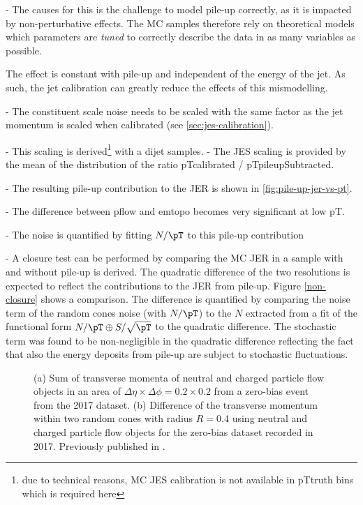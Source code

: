 - The causes for this is the challenge to model pile-up correctly, as it is impacted by non-perturbative effects. The MC samples therefore rely on theoretical models which parameters are \emph{tuned} to correctly describe the data in as many variables as possible.

The effect is constant with pile-up and independent of the energy of the jet. As such, the jet calibration can greatly reduce the effects of this mismodelling.

- The constituent scale noise needs to be scaled with the same factor as the jet momentum is scaled when calibrated (see \cref{sec:jes-calibration}).

- This scaling is derived\footnote{due to technical reasons, MC JES calibration is not available in pTtruth bins which is required here} with a dijet samples.
- The JES scaling is provided by the mean of the distribution of the ratio pTcalibrated / pTpileupSubtracted.

- The resulting pile-up contribution to the JER is shown in \cref{fig:pile-up-jer-vs-pt}.

- The difference between pflow and emtopo becomes very significant at low pT.

- The noise is quantified by fitting $N/\pT$ to this pile-up contribution

- A closure test can be performed by comparing the MC JER in a sample with and without pile-up is derived. The quadratic difference of the two resolutions is expected to reflect the contributions to the JER from pile-up. Figure \cref{non-closure} shows a comparison. The difference is quantified by comparing the noise term of the random cones noise (with $N/\pT$) to the $N$ extracted from a fit of the functional form $N/\pT \oplus S/\sqrt{\pT}$ to the quadratic difference. The stochastic term was found to be non-negligible in the quadratic difference reflecting the fact that also the energy deposits from pile-up are subject to stochastic fluctuations.

\FloatBarrier
\begin{figure}[t]
    \caption{(a) Sum of transverse momenta of neutral and charged particle flow objects in an area of $\Delta \eta \times \Delta \phi = 0.2 \times 0.2$ from a zero-bias event from the 2017 dataset. (b) Difference of the transverse momentum within two random cones with radius $R = 0.4$ using neutral and charged particle flow objects for the zero-bias dataset recorded in 2017.
        Previously published in .}
    \label{fig:random-cones-balance}
\end{figure}

